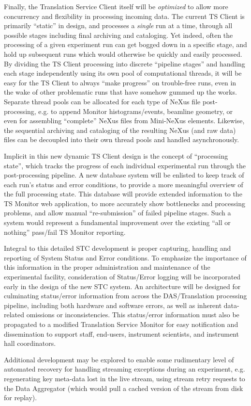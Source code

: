 Finally, the Translation Service Client itself will be {\em optimized}
to allow more concurrency and flexibility in processing incoming data.
The current TS Client is primarily ``static'' in design,
and processes a {\em single} run at a time,
through all possible stages including final archiving and cataloging.
Yet indeed, often the processing of a given experiment run can get
bogged down in a specific stage, and hold up subsequent runs which
would otherwise be quickly and easily processed.
By dividing the TS Client processing into discrete ``pipeline stages''
and handling each stage independently
using its own pool of computational threads,
it will be easy for the TS Client to always ``make progress''
on trouble-free runs, even in the wake of other problematic runs
that have somehow gummed up the works.
Separate thread pools can be allocated for each type
of NeXus file post-processing,
e.g. to append Monitor histograms/events, beamline geometry,
or even for assembling ``complete'' NeXus files from Mini-NeXus elements.
Likewise, the sequential archiving and cataloging of the resulting
NeXus (and raw data) files can be decoupled into their own thread pools
and handled asynchronously.

Implicit in this new dynamic TS Client design
is the concept of ``processing state'',
which tracks the progress of each individual experimental run
through the post-processing pipeline.
A new database system will be enlisted to keep track
of each run's status and error conditions,
to provide a more meaningful overview of the full processing state.
This database will provide extended information
to the TS Monitor web application,
to more accurately show bottlenecks and processing problems,
and allow manual ``re-submission'' of failed pipeline stages.
Such a system would represent a fundamental improvement
over the existing ``all or nothing'' pass/fail TS Monitor reporting.

Integral to this detailed STC development
is proper capturing, handling and reporting of
System Status and Error conditions.
To emphasize the importance of this information
in the proper administration and maintenance
of the experimental facility,
consideration of Status/Error logging will be incorporated
early in the design of the new STC system.
An architecture will be designed for culminating status/error information
from across the DAS/Translation processing pipeline,
including both hardware and software errors,
as well as inherent data-related omissions or inconsistencies.
This status/error information must also be propagated
to a modified Translation Service Monitor
for easy notification and dissemination to support staff, end-users,
instrument scientists, and instrument hall coordinators.

Additional development may be explored to enable some rudimentary level of
automated recovery for handling streaming exceptions during an experiment,
e.g. regenerating key meta-data lost in the live stream,
using stream retry requests to the Data Aggregator
(which would pull a cached version of the stream from disk for replay).

